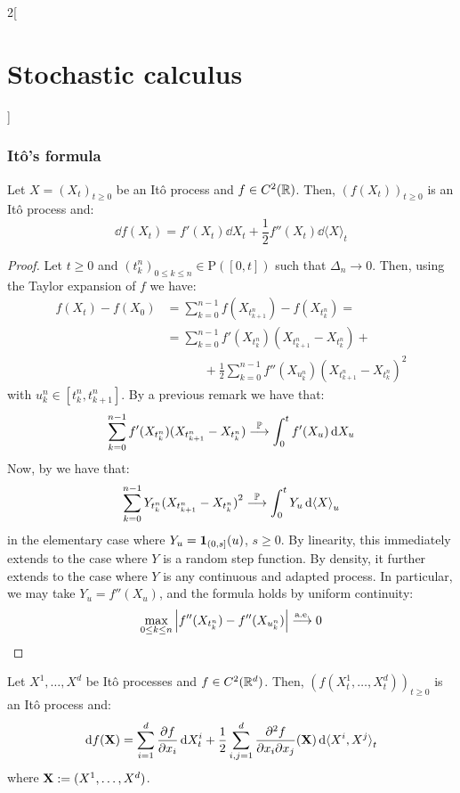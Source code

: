 \documentclass[../../../main_math.tex]{subfiles}
\begin{document}
\begin{multicols}{2}[\section{Stochastic calculus}]
  \subsubsection{Itô's formula}
  \begin{theorem}
    Let $X={(X_t)}_{t\geq 0}$ be an Itô process and $f\in C^2(\mathbb{R})$. Then, ${(f(X_t))}_{t\geq 0}$ is an Itô process and:
    $$
      \dd{f(X_t)}=f'(X_t)\dd{X_t}+\frac{1}{2}f''(X_t)\dd{{\langle X\rangle}_t}
    $$
  \end{theorem}
  \begin{proof}
    Let $t\geq 0$ and ${(t_k^n)}_{0\leq k\leq n}\in \mathrm{P}([0,t])$ such that $\Delta_n\to 0$. Then, using the Taylor expansion of $f$ we have:
    \begin{align*}
      f(X_t)-f(X_0) & =\sum_{k=0}^{n-1}f(X_{t_{k+1}^n})-f(X_{t_k^n})=                                    \\&=\sum_{k=0}^{n-1}f'(X_{t_k^n})(X_{t_{k+1}^n}-X_{t_k^n})+\\
                    & \qquad\quad+\frac{1}{2}\sum_{k=0}^{n-1}f''(X_{u_k^n}){(X_{t_{k+1}^n}-X_{t_k^n})}^2
    \end{align*}
    with $u_k^n\in [t_k^n,t_{k+1}^n]$. By a previous remark we have that:
    $$
      \sum_{k=0}^{n-1}f'(X_{t_k^n})(X_{t_{k+1}^n}-X_{t_k^n})\overset{\mathbb{P}}{\longrightarrow} \int_0^t f'(X_u)\dd{X_u}
    $$
    Now, by  we have that:
    $$
      \sum_{k=0}^{n-1}Y_{t_k^n}{(X_{t_{k+1}^n}-X_{t_k^n})}^2 \overset{\mathbb{P}}{\longrightarrow} \int_0^t Y_u\dd{{\langle X\rangle}_u}
    $$
    in the elementary case where $Y_u=\boldsymbol{\mathrm{1}}_{(0,s]}(u)$, $s\geq 0$. By linearity, this immediately extends to the case where $Y$ is a random step function. By density, it further extends to the case where $Y$ is any continuous and adapted process. In particular, we may take
    $Y_u=f''(X_u)$, and the formula holds by uniform continuity:
    $$
      \max_{0\leq k\leq n}\abs{f''(X_{t_k^n})-f''(X_{u_k^n})}\overset{\text{a.e.}}{\longrightarrow} 0
    $$
  \end{proof}
  \begin{theorem}
    Let $X^1,\ldots,X^d$ be Itô processes and $f\in C^2(\mathbb{R}^d)$. Then, ${(f(X^1_t,\ldots,X^d_t))}_{t\geq 0}$ is an Itô process and:
    $$
      \dd{f(\boldsymbol{\mathrm{X}})} =\sum_{i=1}^d\pdv{f}{x_i}(\boldsymbol{\mathrm{X}})\dd{X^i_t}+\frac{1}{2}\sum_{i,j=1}^d\frac{\partial^2 f}{\partial x_i\partial x_j}(\boldsymbol{\mathrm{X}})\dd{{\langle X^i,X^j\rangle}_t}
    $$
    where $\boldsymbol{\mathrm{X}}:=(X^1,\ldots,X^d)$.
  \end{theorem}

\end{multicols}
\end{document}
